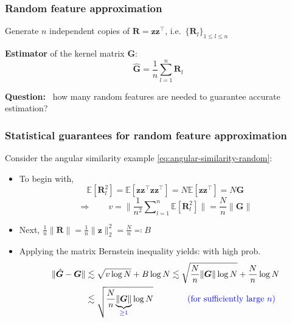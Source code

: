 \documentclass[compress,
mathserif,wide,%
]{beamer}
\begin{document}
\begin{frame}
\frametitle{Random feature approximation}  

	Generate $n$ independent copies of $\bm{R}=\bm{z}\bm{z}^{\top}$, i.e.~$\{\bm{R}_l\}_{1\leq l\leq n}$

	\bigskip
	\bigskip
	
	{\bf Estimator} of the kernel matrix $\bm{G}$:
	\[
		\hat{\bm{G}} = \frac{1}{n} \sum_{l=1}^n \bm{R}_l
	\]


	\bigskip
{

\begin{varblock}[\textwidth]{}
\begin{center}
	{\bf Question:} ~how many random features are needed to guarantee accurate estimation?
\end{center}
\end{varblock}
}

	
\end{frame}




\begin{frame}
\frametitle{Statistical guarantees for random feature approximation}  

Consider the angular similarity example \eqref{eq:angular-similarity-random}: 
%
\begin{itemize}
	\itemsep0.5em
		
	\item To begin with,
%
\[
	\mathbb{E}[\bm{R}_l^2]=\mathbb{E}[\bm{z}\bm{z}^{\top}\bm{z}\bm{z}^{\top}]=N\mathbb{E}[\bm{z}\bm{z}^{\top}]=N\bm{G}
\]
%
\[
	\Longrightarrow\qquad v= \Big\| \frac{1}{n^2} \sum\nolimits _{l=1}^{n}\mathbb{E}[\bm{R}_{l}^{2}] \Big\| = \frac{N}{n} \|\bm{G}\|
\]
%

	\item Next, $ \frac{1}{n}\|\bm{R}\| = \frac{1}{n} \|\bm{z}\|_2^2 = \frac{N}{n} \eqqcolon B$

	\item Applying the matrix Bernstein inequality yields: with high prob.
	\begin{align*}
		\|\hat{\bm{G}}-\bm{G}\| &\lesssim\sqrt{v\log N}+B\log N\lesssim  \sqrt{ \frac{N}{n} \|\bm{G}\| \log N } + \frac{N}{n}\log N  \\
					&\lesssim  \sqrt{ \frac{N}{n} \underset{\textcolor{blue}{ \geq 1}}{\underbrace{ \|\bm{G}\| }} \log N }   \qquad \qquad \textcolor{blue}{ \text{(for sufficiently large }n)}
	\end{align*}

\end{itemize}

\end{frame}
\end{document}
